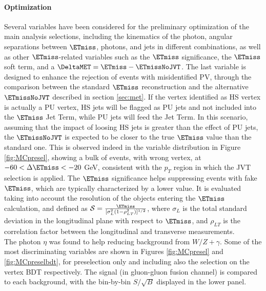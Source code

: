 \paragraph{Optimization}
Several variables have been considered for the preliminary optimization of the main analysis selections, including the kinematics of the photon, angular separations between $\ETmiss$, photons, and jets in different combinations, as well as other $\ETmiss$-related variables such as the $\ETmiss$ significance, the $\ETmiss$ soft term, and a $\DeltaMET=\ETmiss-\ETmissNoJVT$. The last variable is designed to enhance the rejection of events with misidentified PV, through the comparison between the standard $\ETmiss$ reconstruction and the alternative $\ETmissNoJVT$ described in section \ref{sec:met}. If the vertex identified as HS vertex is actually a PU vertex, HS jets will be flagged as PU jets and not included into the $\ETmiss$ Jet Term, while PU jets will feed the Jet Term. In this scenario, assuming that the impact of loosing HS jets is greater than the effect of PU jets, the $\ETmissNoJVT$ is expected to be closer to the true $\ETmiss$ value than the standard one. This is observed indeed in the variable distribution in Figure \ref{fig:MCpresel}, showing a bulk of events, with wrong vertex, at $-60 < \Delta\ETmiss < -20$ GeV, consistent with the $p_{T}$ region in which the JVT selection is applied.
The $\ETmiss$ significance helps suppressing events with fake $\ETmiss$, which are typically characterized by a lower value. 
It is evaluated taking into account the resolution of the objects entering the $\ETmiss$ calculation, and defined as $\mathcal{S}=\frac{\ETmiss}{[\sigma^2_{L}(1-\rho_{LT}^2)]^{1/2}}$, where $\sigma_L$ is the  total standard deviation in the longitudinal plane with respect to $\ETmiss$, and $\rho_{LT}$ is the correlation factor between the longitudinal and transverse measurements.\\
The photon $\eta$ was found to help reducing background from $W/Z+\gamma$. 
Some of the most discriminating variables are shown in Figures \ref{fig:MCpresel} and \ref{fig:MCpreselbdt}, for preselection only and including also the selection on the vertex BDT respectively. The \Htoyyd signal (in gluon-gluon fusion channel) is compared to each background, with the bin-by-bin $S/\sqrt{B}$ displayed in the lower panel.\\


